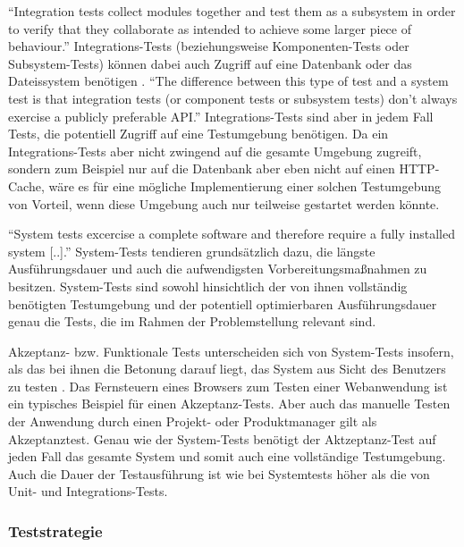 
"`Integration tests collect modules together and test them as a subsystem in order to verify that they collaborate as intended to achieve some larger piece of behaviour."' \citep[S.][S. 10]{microservicetesting}Integrations-Tests (beziehungsweise Komponenten-Tests oder Subsystem-Tests) können dabei auch Zugriff auf eine Datenbank oder das Dateissystem benötigen \citep[Vgl.][S. 133]{DuvMatAnd07}. "`The difference between this type of test and a system test is that integration tests (or component tests or subsystem tests) don't always exercise a publicly preferable API."' \citep[S.][S. 136]{DuvMatAnd07} Integrations-Tests sind aber in jedem Fall Tests, die potentiell Zugriff auf eine Testumgebung benötigen. Da ein Integrations-Tests aber nicht zwingend auf die gesamte Umgebung zugreift, sondern zum Beispiel nur auf die Datenbank aber eben nicht auf einen HTTP-Cache, wäre es für eine mögliche Implementierung einer solchen Testumgebung von Vorteil, wenn diese Umgebung auch nur teilweise gestartet werden könnte.


"`System tests excercise a complete software and therefore require a fully installed system [..]."' \citep[S.][S. 136]{DuvMatAnd07} System-Tests tendieren grundsätzlich dazu, die längste Ausführungsdauer und auch die aufwendigsten Vorbereitungsmaßnahmen zu besitzen. \citep[Vgl.][S. 136]{DuvMatAnd07} System-Tests sind sowohl hinsichtlich der von ihnen vollständig benötigten Testumgebung und der potentiell optimierbaren Ausführungsdauer genau die Tests, die im Rahmen der Problemstellung relevant sind.


Akzeptanz- bzw. Funktionale Tests unterscheiden sich von System-Tests insofern, als das bei ihnen die Betonung darauf liegt, das System aus Sicht des Benutzers zu testen \citep[Vgl.][S. 136]{DuvMatAnd07}. Das Fernsteuern eines Browsers zum Testen einer Webanwendung ist ein typisches Beispiel für einen Akzeptanz-Tests. Aber auch das manuelle Testen der Anwendung durch einen Projekt- oder Produktmanager gilt als Akzeptanztest. Genau wie der System-Tests benötigt der Aktzeptanz-Test auf jeden Fall das gesamte System und somit auch eine vollständige Testumgebung. Auch die Dauer der Testausführung ist wie bei Systemtests höher als die von Unit- und Integrations-Tests.

\subsubsection{Teststrategie}

